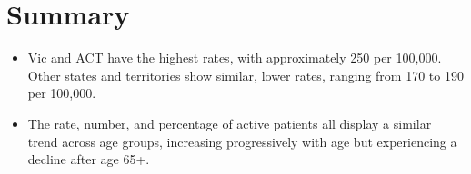 \documentclass[
  a4paper,
  DIV=11,
  numbers=noendperiod]{scrreport}
\begin{document}
\hypertarget{summary-10}{%
\section{Summary}\label{summary-10}}

\begin{itemize}
\item
  Vic and ACT have the highest rates, with approximately 250 per
  100,000. Other states and territories show similar, lower rates,
  ranging from 170 to 190 per 100,000.
\item
  The rate, number, and percentage of active patients all display a
  similar trend across age groups, increasing progressively with age but
  experiencing a decline after age 65+.
\end{itemize}
\end{document}
